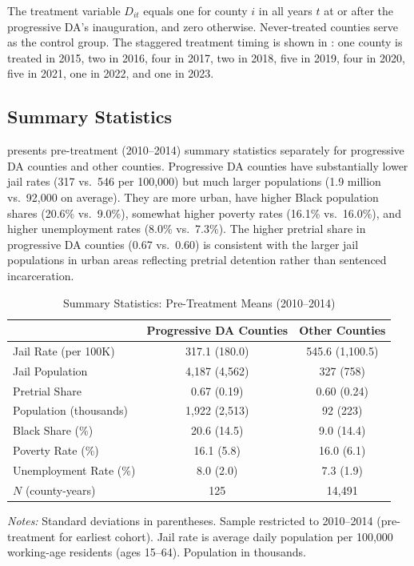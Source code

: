 \documentclass[12pt]{article}
\begin{document}
The treatment variable $D_{it}$ equals one for county $i$ in all years $t$ at or after the progressive DA's inauguration, and zero otherwise. Never-treated counties serve as the control group. The staggered treatment timing is shown in : one county is treated in 2015, two in 2016, four in 2017, two in 2018, five in 2019, four in 2020, five in 2021, one in 2022, and one in 2023.

\subsection{Summary Statistics}

 presents pre-treatment (2010--2014) summary statistics separately for progressive DA counties and other counties. Progressive DA counties have substantially lower jail rates (317 vs.\ 546 per 100,000) but much larger populations (1.9 million vs.\ 92,000 on average). They are more urban, have higher Black population shares (20.6\% vs.\ 9.0\%), somewhat higher poverty rates (16.1\% vs.\ 16.0\%), and higher unemployment rates (8.0\% vs.\ 7.3\%). The higher pretrial share in progressive DA counties (0.67 vs.\ 0.60) is consistent with the larger jail populations in urban areas reflecting pretrial detention rather than sentenced incarceration.

\begin{table}[H]
\centering
\caption{Summary Statistics: Pre-Treatment Means (2010--2014)}
\label{tab:summary_stats}
\begin{threeparttable}
\begin{tabular}{lcc}
\toprule
 & Progressive DA Counties & Other Counties \\
\midrule
Jail Rate (per 100K) & 317.1 (180.0) & 545.6 (1,100.5) \\
Jail Population & 4,187 (4,562) & 327 (758) \\
Pretrial Share & 0.67 (0.19) & 0.60 (0.24) \\
Population (thousands) & 1,922 (2,513) & 92 (223) \\
Black Share (\%) & 20.6 (14.5) & 9.0 (14.4) \\
Poverty Rate (\%) & 16.1 (5.8) & 16.0 (6.1) \\
Unemployment Rate (\%) & 8.0 (2.0) & 7.3 (1.9) \\
\midrule
$N$ (county-years) & 125 & 14,491 \\
\bottomrule
\end{tabular}
\begin{tablenotes}[flushleft]
\small
\item \textit{Notes:} Standard deviations in parentheses. Sample restricted to 2010--2014 (pre-treatment for earliest cohort). Jail rate is average daily population per 100,000 working-age residents (ages 15--64). Population in thousands.
\end{tablenotes}
\end{threeparttable}
\end{table}
\end{document}
